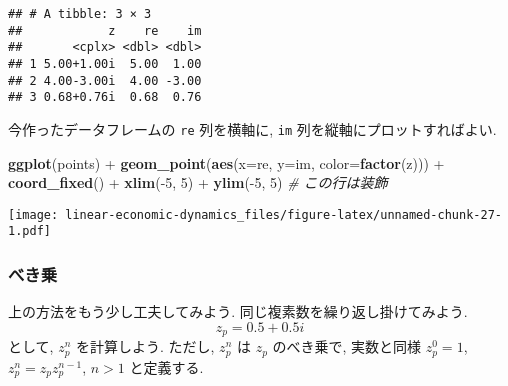 \documentclass[a4paper]{scrbook}
\newenvironment{Shaded}{\begin{snugshade}}{\end{snugshade}}
\newcommand{\KeywordTok}[1]{\textcolor[rgb]{0.13,0.29,0.53}{\textbf{{#1}}}}
\newcommand{\DataTypeTok}[1]{\textcolor[rgb]{0.13,0.29,0.53}{{#1}}}
\newcommand{\DecValTok}[1]{\textcolor[rgb]{0.00,0.00,0.81}{{#1}}}
\newcommand{\StringTok}[1]{\textcolor[rgb]{0.31,0.60,0.02}{{#1}}}
\newcommand{\CommentTok}[1]{\textcolor[rgb]{0.56,0.35,0.01}{\textit{{#1}}}}
\newcommand{\NormalTok}[1]{{#1}}
\theoremstyle{definition}
\begin{document}
\begin{verbatim}
## # A tibble: 3 × 3
##            z    re    im
##       <cplx> <dbl> <dbl>
## 1 5.00+1.00i  5.00  1.00
## 2 4.00-3.00i  4.00 -3.00
## 3 0.68+0.76i  0.68  0.76
\end{verbatim}

今作ったデータフレームの \texttt{re} 列を横軸に, \texttt{im}
列を縦軸にプロットすればよい.

\begin{Shaded}
\begin{Highlighting}[]
\KeywordTok{ggplot}\NormalTok{(points) +}\StringTok{ }\KeywordTok{geom_point}\NormalTok{(}\KeywordTok{aes}\NormalTok{(}\DataTypeTok{x=}\NormalTok{re, }\DataTypeTok{y=}\NormalTok{im, }\DataTypeTok{color=}\KeywordTok{factor}\NormalTok{(z))) +}\StringTok{ }
\StringTok{  }\KeywordTok{coord_fixed}\NormalTok{() +}\StringTok{ }\KeywordTok{xlim}\NormalTok{(-}\DecValTok{5}\NormalTok{, }\DecValTok{5}\NormalTok{) +}\StringTok{ }\KeywordTok{ylim}\NormalTok{(-}\DecValTok{5}\NormalTok{, }\DecValTok{5}\NormalTok{) }\CommentTok{# この行は装飾}
\end{Highlighting}
\end{Shaded}

\texttt{[image: linear-economic-dynamics\_files/figure-latex/unnamed-chunk-27-1.pdf]}

\subsubsection*{べき乗}

上の方法をもう少し工夫してみよう. 同じ複素数を繰り返し掛けてみよう. \[
  z_p = 0.5 + 0.5i
\] として, \(z_p^n\) を計算しよう. ただし, \(z_p^n\) は \(z_p\)
のべき乗で, 実数と同様 \(z_p^0 = 1\), \(z_p^n = z_p z_p^{n-1}\),
\(n > 1\) と定義する.
\end{document}
